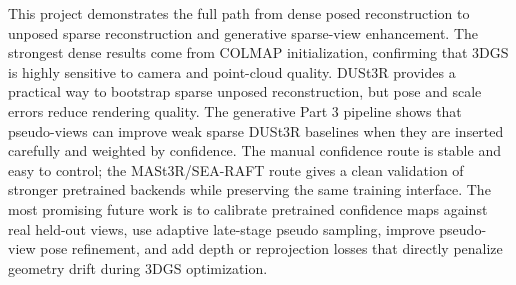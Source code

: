 \documentclass[10pt,twocolumn,letterpaper]{article}
\begin{document}
This project demonstrates the full path from dense posed reconstruction to unposed sparse reconstruction and generative sparse-view enhancement.  The strongest dense results come from COLMAP initialization, confirming that 3DGS is highly sensitive to camera and point-cloud quality.  DUSt3R provides a practical way to bootstrap sparse unposed reconstruction, but pose and scale errors reduce rendering quality.  The generative Part 3 pipeline shows that pseudo-views can improve weak sparse DUSt3R baselines when they are inserted carefully and weighted by confidence.  The manual confidence route is stable and easy to control; the MASt3R/SEA-RAFT route gives a clean validation of stronger pretrained backends while preserving the same training interface.  The most promising future work is to calibrate pretrained confidence maps against real held-out views, use adaptive late-stage pseudo sampling, improve pseudo-view pose refinement, and add depth or reprojection losses that directly penalize geometry drift during 3DGS optimization.
\end{document}
